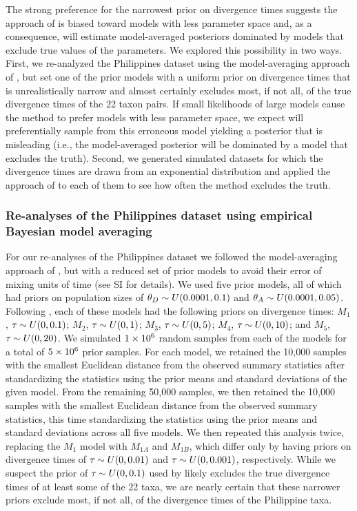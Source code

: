 The strong preference for the narrowest prior on divergence times suggests the
approach of \citet{Hickerson2013} is biased toward models with less parameter
space and, as a consequence, will estimate model-averaged posteriors dominated
by models that exclude true values of the parameters.
We explored this possibility in two ways.
First, we re-analyzed the Philippines dataset using the model-averaging
approach of \citet{Hickerson2013}, but set one of the prior models with a
uniform prior on divergence times that is unrealistically narrow and almost
certainly excludes most, if not all, of the true divergence times of the 22
taxon pairs.
If small likelihoods of large models cause the method to prefer models with
less parameter space, we expect \msb will preferentially sample from this
erroneous model yielding a posterior that is misleading (i.e., the
model-averaged posterior will be dominated by a model that excludes
the truth).
Second, we generated simulated datasets for which the divergence times are
drawn from an exponential distribution and applied the approach of
\citet{Hickerson2013} to each of them to see how often the method excludes the
truth.

\subsubsection{Re-analyses of the Philippines dataset using empirical Bayesian
model averaging}

For our re-analyses of the Philippines dataset we followed the model-averaging
approach of \citet{Hickerson2013}, but with a reduced set of prior models to
avoid their error of mixing units of time (see SI for details).
We used five prior models, all of which had priors on population sizes of
$\meanDescendantTheta{} \sim U(0.0001, 0.1)$ and $\ancestralTheta{} \sim
U(0.0001, 0.05)$.
Following \citet{Hickerson2013}, each of these models had the following
priors on divergence times:
$M_1$, $\tau_{} \sim U(0, 0.1)$;
$M_2$, $\tau_{} \sim U(0, 1)$;
$M_3$, $\tau_{} \sim U(0, 5)$;
$M_4$, $\tau_{} \sim U(0, 10)$; and
$M_5$, $\tau_{} \sim U(0, 20)$.
We simulated $1\times 10^{6}$ random samples from each of the models for a total of
$5\times 10^{6}$ prior samples.
For each model, we retained the 10,000 samples with the smallest Euclidean
distance from the observed summary statistics after standardizing the
statistics using the prior means and standard deviations of the given model.
From the remaining 50,000 samples, we then retained the 10,000 samples with the
smallest Euclidean distance from the observed summary statistics, this time
standardizing the statistics using the prior means and standard deviations
across all five models.
We then repeated this analysis twice, replacing the $M_1$ model with
$M_{1A}$ and $M_{1B}$, which differ only by having priors on divergence
times of $\tau_{} \sim U(0, 0.01)$ and $\tau_{} \sim U(0, 0.001)$,
respectively.
While we suspect the prior of $\tau_{} \sim U(0, 0.1)$ used by
\citet{Hickerson2013} likely excludes the true divergence times of at least
some of the 22 taxa, we are nearly certain that these narrower priors exclude
most, if not all, of the divergence times of the Philippine taxa.

